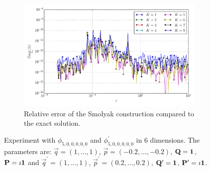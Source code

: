 \documentclass[a4paper,10pt]{article}
\begin{document}
\begin{figure}[ht!]
\begin{subfigure}[t]{0.5\linewidth}
    \includegraphics[width=\linewidth]{./plots/tp_sg_6d_conv_eps_(5,0,0,0,0,0)_(5,0,0,0,0,0)_err_rel_nsd_gk.pdf}
    \caption{Relative error of the Smolyak construction compared to the exact solution.}
    \label{fig:tp_sg_6d_conv_p_500000_500000_err_rel_nsd_gk}
  \end{subfigure}
  \label{fig:tp_sg_6d_conv_p_500000_500000}
  \caption{Experiment with $\phi_{5,0,0,0,0,0}$ and $\phi_{5,0,0,0,0,0}^{\prime}$
  in 6 dimensions.
  The parameters are:
  $\vec{q} = (1, \ldots, 1)$,
  $\vec{p} = (-0.2, \ldots, -0.2)$,
  $\mathbf{Q} = \mathbf{1}$,
  $\mathbf{P} = \imath \mathbf{1}$
  and
  $\vec{q}^\prime = (1, \ldots, 1)$,
  $\vec{p}^\prime = (0.2, \ldots, 0.2)$,
  $\mathbf{Q}^\prime = \mathbf{1}$,
  $\mathbf{P}^\prime = \imath \mathbf{1}$.}
\end{figure}
\end{document}
